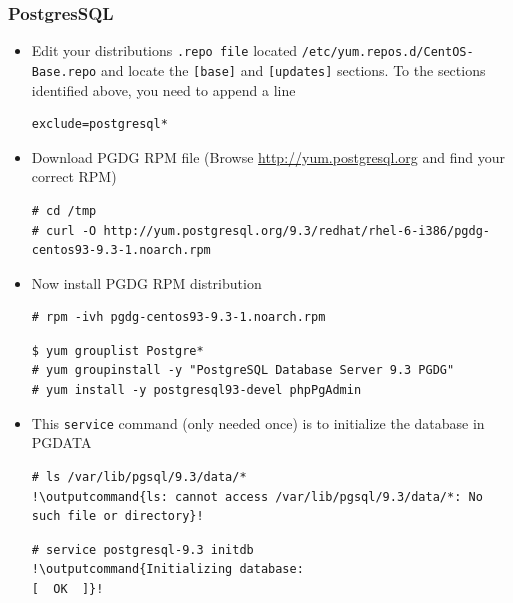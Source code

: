 \documentclass{beamer}
\newcommand{\outputcommand}[1]{\color{darkgreen}{#1}}
\begin{document}
\begin{frame}
\frametitle{PostgresSQL}
\begin{itemize}
\item Edit your distributions \texttt{.repo file} located \texttt{/etc/yum.repos.d/CentOS-Base.repo} and locate the \texttt{[base]} and \texttt{[updates]} sections.
To the sections identified above, you need to append a line

\lstset{language=shell, escapechar=!,numbers=left}
\begin{lstlisting}[escapechar=!]
exclude=postgresql*
\end{lstlisting}

\item Download PGDG RPM file (Browse \url{http://yum.postgresql.org} and find your correct RPM)

\lstset{language=shell, escapechar=!}
\begin{lstlisting}[escapechar=!]
# cd /tmp
# curl -O http://yum.postgresql.org/9.3/redhat/rhel-6-i386/pgdg-centos93-9.3-1.noarch.rpm
\end{lstlisting}

\item Now install PGDG RPM  distribution

\begin{lstlisting}[escapechar=!]
# rpm -ivh pgdg-centos93-9.3-1.noarch.rpm
\end{lstlisting}

\lstset{language=shell, escapechar=!}
\begin{lstlisting}[escapechar=!]
$ yum grouplist Postgre*
# yum groupinstall -y "PostgreSQL Database Server 9.3 PGDG"
# yum install -y postgresql93-devel phpPgAdmin
\end{lstlisting}

\item This \texttt{service} command (only needed once) is to initialize the database in PGDATA
 
\lstset{language=shell, escapechar=!}
\begin{lstlisting}[escapechar=!]
# ls /var/lib/pgsql/9.3/data/*
!\outputcommand{ls: cannot access /var/lib/pgsql/9.3/data/*: No such file or directory}!
\end{lstlisting}


\lstset{language=shell, escapechar=!}
\begin{lstlisting}[escapechar=!]
# service postgresql-9.3 initdb
!\outputcommand{Initializing database:                                     [  OK  ]}!
\end{lstlisting}


\end{itemize}
\end{frame}
\end{document}
